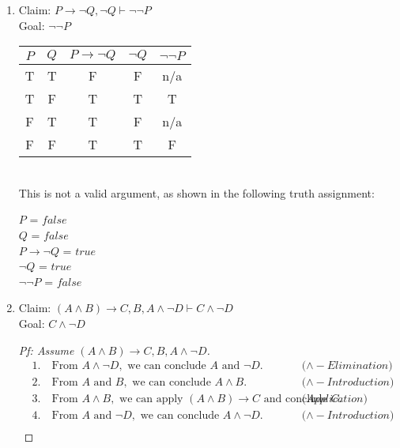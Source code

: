 \documentclass{article}
\begin{document}
\begin{enumerate}
\begin{enumerate}
        \item
        Claim: $P \rightarrow \neg Q, \neg Q \vdash \neg \neg P$ \\
        Goal: $\neg \neg P$ \\
        \begin{tabular}{| c | c | c | c | c |}
            \hline
            $P$ & $Q$ & $P \rightarrow \neg Q$ & $\neg Q$ & $\neg \neg P$ \\
            \hline
            T & T & F & F & n/a \\
            \hline
            T & F & T & T & T \\
            \hline
            F & T & T & F & n/a \\
            \hline
            F & F & T & T & F \\
            \hline
        \end{tabular} \\

        This is not a valid argument, as shown in the following truth assignment:
        
        $P$ = $false$ \\
        $Q$ = $false$ \\
        $P \rightarrow \neg Q$ = $true$ \\
        $\neg Q$ = $true$ \\
        $\neg \neg P$ = $false$ \\

        \item
        Claim: $(A \land B) \rightarrow C, B, A \land \neg D \vdash C \land \neg D$ \\
        Goal: $C \land \neg D$
        \begin{proof}[Pf: Assume $(A \land B) \rightarrow C, B, A \land \neg D$]
            \begin{align*}
                &1. \quad \text{From } A \land \neg D, \text{ we can conclude } A \text{ and } \neg D. && \text{($\land - Elimination$)} \\
                &2. \quad \text{From } A \text{ and } B, \text{ we can conclude } A \land B. && \text{($\land - Introduction$)} \\
                &3. \quad \text{From } A \land B, \text{ we can apply } (A \land B) \rightarrow C \text{ and conclude } C. && \text{($Application$)} \\
                &4. \quad \text{From } A \text{ and } \neg D, \text{ we can conclude } A \land \neg D. && \text{($\land - Introduction$)} \\
            \end{align*}
        \end{proof}


\end{enumerate}
\end{enumerate}
\end{document}
